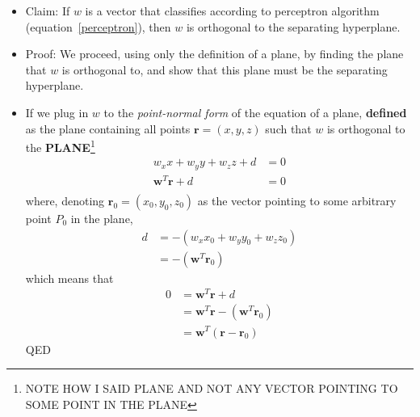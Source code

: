 \documentclass[12pt]{article}
\newcommand{\myspace}{\vspace{2\bigskipamount}}
\newcommand\p{\Needspace{10\baselineskip} \noindent}
\begin{document}
\p \begin{footnotesize} \textbf{}
	\begin{itemize}
		\item Claim: If $w$ is a vector that classifies according to perceptron algorithm (equation~\ref{perceptron}), then $w$ is orthogonal to the separating hyperplane. 
		\item Proof: We proceed, using only the definition of a plane, by finding the plane that $w$ is orthogonal to, and show that this plane must be the separating hyperplane. 
		\item If we plug in $w$ to the \textit{point-normal form} of the equation of a plane, \textbf{defined} as the plane containing all points  $\bm{r }= (x, y, z)$ such that $w$ is orthogonal to the \textbf{PLANE}\footnote{NOTE HOW I SAID PLANE AND NOT ANY VECTOR POINTING TO SOME POINT IN THE PLANE}
		\begin{align}
		w_x x + w_y y + w_z z + d &= 0 \\
		\bm{w}^T \bm{r} + d &= 0 \\
		\end{align}
		where, denoting $\bm{r}_0= (x_0, y_0, z_0)$ as the vector pointing to some arbitrary point $P_0$ in the plane,
		\begin{align}
		d &= -(w_x x_0 + w_y y_0 + w_z z_0 ) \\
		&=  - (\bm{w}^T \bm{r}_0)
		\end{align}
		which means that 
		\begin{align}
		0 &= \bm{w}^T \bm{r} + d\\
		&= \bm{w}^T \bm{r} - (\bm{w}^T \bm{r}_0)  \\
		&= \bm{w}^T (\bm{r} -  \bm{r}_0)
		\end{align}
		QED
	\end{itemize}
\end{footnotesize}
\myspace 
\end{document}
